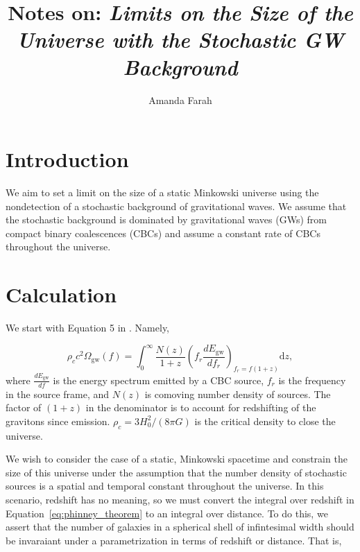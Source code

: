 \documentclass[]{article}
\title{Notes on: \emph{Limits on the Size of the Universe with the Stochastic GW Background}}
\author{Amanda Farah}
\newcommand{\Ogw}{\Omega_{\mathrm{gw}}}
\begin{document}
\maketitle

%

\section{Introduction}
We aim to set a limit on the size of a static Minkowski universe using the nondetection of a stochastic background of gravitational waves. 
We assume that the stochastic background is dominated by gravitational waves (GWs) from compact binary coalescences (CBCs) and assume a constant rate of CBCs throughout the universe.

\section{Calculation}

We start with Equation 5 in \cite{Phinney_theorem}. Namely,

\begin{equation}
	\rho_c c^2 \Ogw(f) =  \int_{0}^{\infty} \frac{N(z)}{1+z} (f_r \frac{dE_{\mathrm{gw}}}{df_r})_{f_r = f(1+z)} \mathrm{d}z ,
	\label{eq:phinney_theorem}
\end{equation}
where $\frac{dE_{\mathrm{gw}}}{df}$ is the energy spectrum emitted by a CBC source, $f_r$ is the frequency in the source frame, and $N(z)$ is comoving number density of sources.
The factor of $(1+z)$ in the denominator is to account for redshifting of the gravitons since emission. 
$\rho_c = 3 H_0^2/(8\pi G)$ is the critical density to close the universe.
	
We wish to consider the case of a static, Minkowski spacetime and constrain the size of this universe under the assumption that the number density of stochastic sources is a spatial and temporal constant throughout the universe.
In this scenario, redshift has no meaning, so we must convert the integral over redshift in Equation~\ref{eq:phinney_theorem} to an integral over distance.
To do this, we assert that the number of galaxies in a spherical shell of infintesimal width should be invaraiant under a parametrization in terms of redshift or distance. 
That is,
\end{document}
